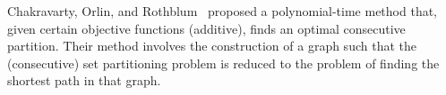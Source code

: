 \documentclass{article}
\newtheorem{proposition}[thm]{Proposition}
\DeclareMathOperator{\support}{support}
\begin{document}
%
%
%
%
%

Chakravarty, Orlin, and Rothblum~\cite{chakravarty1982partitioning} proposed a polynomial-time method that, given certain objective functions (additive), finds an optimal consecutive partition. Their method involves the construction of a graph such that the (consecutive) set partitioning problem is reduced to the problem of finding the shortest path in that graph.
\end{document}
